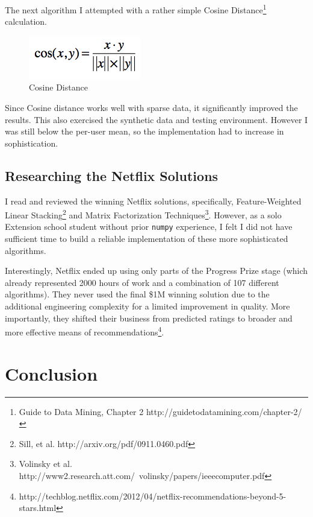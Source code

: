 \documentclass[11pt, oneside]{article}   	%
\begin{document}
The next algorithm I attempted with a rather simple Cosine Distance\footnote{Guide to Data Mining, Chapter 2 http://guidetodatamining.com/chapter-2/}
calculation.
\begin{figure}[h!]
\centering
\includegraphics[scale=0.8]{cosine}
\caption{Cosine Distance}
\end{figure}

Since Cosine distance works well with sparse data, it significantly improved the results. This also exercised the synthetic data and testing environment. However I was still below the per-user mean, so the implementation had to increase in sophistication.

\subsection*{Researching the Netflix Solutions}

I read and reviewed the winning Netflix solutions, specifically, Feature-Weighted Linear Stacking\footnote{Sill, et al. http://arxiv.org/pdf/0911.0460.pdf} and Matrix Factorization Techniques\footnote{Volinsky et al. http://www2.research.att.com/~volinsky/papers/ieeecomputer.pdf}. However, as a solo Extension school student without prior \texttt{numpy} experience, I felt I did not have sufficient time to build a reliable implementation of these more sophisticated algorithms. 

Interestingly, Netflix ended up using only parts of the Progress Prize stage (which already represented 2000 hours of work and a combination of 107 different algorithms). They never used the final \$1M winning solution due to the additional engineering complexity for a limited improvement in quality. More importantly, they shifted their business from predicted ratings to broader and more effective means of recommendations\footnote{http://techblog.netflix.com/2012/04/netflix-recommendations-beyond-5-stars.html}.

\section*{Conclusion}
\end{document}
